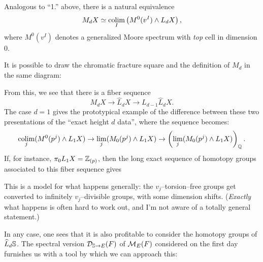 \begin{theorem}
Analogous to ``1.'' above, there is a natural equivalence \[M_d X \simeq \colim_I \left( M^0(v^I) \sm L_d X \right),\] where $M^0(v^I)$ denotes a generalized Moore spectrum with \emph{top} cell in dimension $0$.
\end{theorem}

\begin{remark}
It is possible to draw the chromatic fracture square and the definition of $M_d$ in the same diagram:
\begin{center}
\end{center}
From this, we see that there is a fiber sequence \[M_d X \to \widehat L_d X \to L_{d-1} \widehat L_d X.\]  The case $d = 1$ gives the prototypical example of the difference between these two presentations of the ``exact height $d$ data'', where the sequence becomes: \[\colim_j (M^0(p^j) \sm L_1 X) \to \lim_j (M_0(p^j) \sm L_1 X) \to \left( \lim_j (M_0(p^j) \sm L_1 X) \right)_{\Q}.\]  If, for instance, $\pi_0 L_1 X = \Z_{(p)}$, then the long exact sequence of homotopy groups associated to this fiber sequence gives
\begin{center}
\end{center}
This is a model for what happens generally: the $v_j$--torsion--free groups get converted to infinitely $v_j$--divisible groups, with some dimension shifts.  (\emph{Exactly} what happens is often hard to work out, and I'm not aware of a totally general statement.)
\end{remark}

In any case, one sees that it is also profitable to consider the homotopy groups of $\widehat L_d \S$.  The spectral version $\sheaf D_{\S \to E}(F)$ of $\context{E}(F)$ considered on the first day furnishes us with a tool by which we can approach this:

